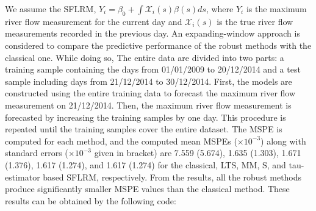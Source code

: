 We assume the SFLRM, $Y_i = \beta_0 + \int \mathcal{X}_i(s) \beta(s) ds$, where $Y_i$ is the maximum river flow measurement for the current day and $\mathcal{X}_i(s)$ is the true river flow measurements recorded in the previous day. An expanding-window approach is considered to compare the predictive performance of the robust methods with the classical one. While doing so, The entire data are divided into two parts: a training sample containing the days from 01/01/2009 to 20/12/2014 and a test sample including days from 21/12/2014 to 30/12/2014. First, the models are constructed using the entire training data to forecast the maximum river flow measurement on 21/12/2014. Then, the maximum river flow measurement is forecasted by increasing the training samples by one day. This procedure is repeated until the training samples cover the entire dataset. The MSPE is computed for each method, and the computed mean MSPEs ($\times 10^{-3}$) along with standard errors ($\times 10^{-3}$ given in bracket) are 7.559 (5.674), 1.635 (1.303), 1.671 (1.376), 1.617 (1.274), and 1.617 (1.274) for the classical, LTS, MM, S, and tau-estimator based SFLRM, respectively. From the results, all the robust methods produce significantly smaller MSPE values than the classical method. These results can be obtained by the following code:
